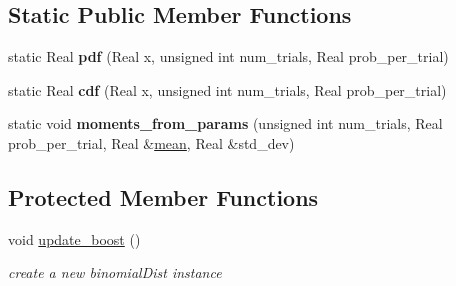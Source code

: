 \subsection*{Static Public Member Functions}
\begin{DoxyCompactItemize}
\item 
static Real {\bfseries pdf} (Real x, unsigned int num\+\_\+trials, Real prob\+\_\+per\+\_\+trial)\label{classPecos_1_1BinomialRandomVariable_a2886ea0e23e30bbbc464565416eb6614}

\item 
static Real {\bfseries cdf} (Real x, unsigned int num\+\_\+trials, Real prob\+\_\+per\+\_\+trial)\label{classPecos_1_1BinomialRandomVariable_a630e535fde694c4b082312a4fd082f3d}

\item 
static void {\bfseries moments\+\_\+from\+\_\+params} (unsigned int num\+\_\+trials, Real prob\+\_\+per\+\_\+trial, Real \&\hyperlink{classPecos_1_1BinomialRandomVariable_a962ffe5a3593be370d5c883365c060f4}{mean}, Real \&std\+\_\+dev)\label{classPecos_1_1BinomialRandomVariable_ab5304d2842c683e30818638d9e7150ba}

\end{DoxyCompactItemize}
\subsection*{Protected Member Functions}
\begin{DoxyCompactItemize}
\item 
void \hyperlink{classPecos_1_1BinomialRandomVariable_aaa6750cbee2245416a6eeeac58d4405a}{update\+\_\+boost} ()\label{classPecos_1_1BinomialRandomVariable_aaa6750cbee2245416a6eeeac58d4405a}

\begin{DoxyCompactList}\small\item\em create a new binomial\+Dist instance \end{DoxyCompactList}\end{DoxyCompactItemize}
